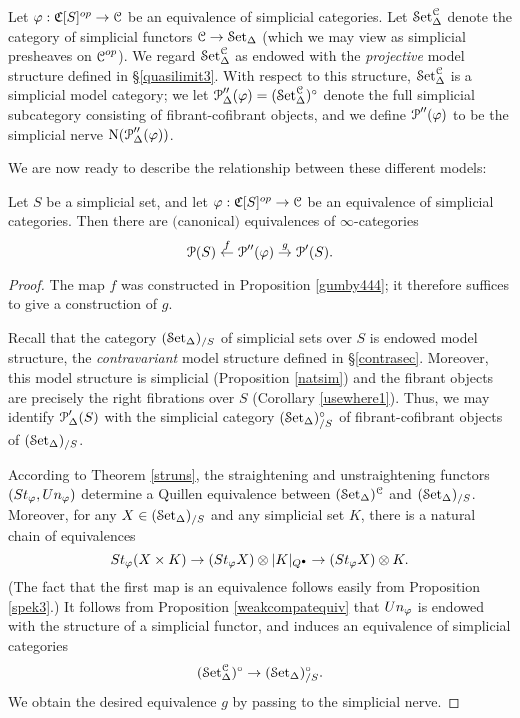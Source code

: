 Let $\varphi: \operatorname{\mathfrak{C}}[S]^{op} \rightarrow \operatorname{\mathcal{C}}$ be an equivalence of simplicial categories.
Let $\operatorname{\mathcal{S}et}_{\Delta}^{\operatorname{\mathcal{C}}}$ denote the category of simplicial functors $\operatorname{\mathcal{C}} \rightarrow \operatorname{\mathcal{S}et_{\Delta}}$ (which we may view as simplicial presheaves on $\operatorname{\mathcal{C}}^{op}$). We regard $\operatorname{\mathcal{S}et}_{\Delta}^{\operatorname{\mathcal{C}}}$ as endowed with the {\em projective} model structure defined in \S \ref{quasilimit3}. With respect to this structure,
$\operatorname{\mathcal{S}et}_{\Delta}^{\operatorname{\mathcal{C}}}$ is a simplicial model category; we let $\operatorname{\mathcal{P}}''_{\Delta}(\varphi) =  (\operatorname{\mathcal{S}et}_{\Delta}^{\operatorname{\mathcal{C}}})^{\circ}$ denote the full simplicial subcategory consisting of fibrant-cofibrant objects, and we define $\operatorname{\mathcal{P}}''(\varphi)$ to be the simplicial nerve $\operatorname{N}(\operatorname{\mathcal{P}}''_{\Delta}(\varphi))$.

We are now ready to describe the relationship between these different models:

\begin{proposition}\label{othermod}
Let $S$ be a simplicial set, and let $\varphi: \operatorname{\mathfrak{C}}[S]^{op} \rightarrow \operatorname{\mathcal{C}}$ be
an equivalence of simplicial categories. Then there are $($canonical$)$ equivalences
of $\infty$-categories
$$ \operatorname{\mathcal{P}}(S) \stackrel{f}{\leftarrow} \operatorname{\mathcal{P}}''(\varphi) \stackrel{g}{\rightarrow} \operatorname{\mathcal{P}}'(S).$$
\end{proposition}

\begin{proof}
The map $f$ was constructed in Proposition \ref{gumby444}; it therefore suffices to give a construction of $g$. 

Recall that the category $(\operatorname{\mathcal{S}et_{\Delta}})_{/S}$ of simplicial sets over $S$ is endowed model structure, the {\it contravariant} model structure defined in \S \ref{contrasec}. Moreover, this model structure is simplicial (Proposition \ref{natsim}) and the fibrant objects are precisely the right fibrations over $S$ (Corollary \ref{usewhere1}). Thus, we may identify
$\operatorname{\mathcal{P}}'_{\Delta}(S)$ with the simplicial category $(\operatorname{\mathcal{S}et_{\Delta}})_{/S}^{\circ}$ of fibrant-cofibrant objects of $(\operatorname{\mathcal{S}et_{\Delta}})_{/S}$. 

According to Theorem \ref{struns}, the straightening and unstraightening functors
$(St_{\varphi}, Un_{\varphi})$ determine a Quillen equivalence between
$(\operatorname{\mathcal{S}et_{\Delta}})^{\operatorname{\mathcal{C}}}$ and $(\operatorname{\mathcal{S}et_{\Delta}})_{/S}$. Moreover, for any $X \in (\operatorname{\mathcal{S}et_{\Delta}})_{/S}$ and any simplicial set $K$, there is a natural chain of equivalences
$$ St_{\varphi} (X \times K) \rightarrow (St_{\varphi} X) \otimes |K|_{Q^{\bullet}} \rightarrow
(St_{\varphi} X) \otimes K.$$
(The fact that the first map is an equivalence follows easily from Proposition \ref{spek3}.)
It follows from Proposition \ref{weakcompatequiv} that $Un_{\varphi}$ is endowed with the structure of a simplicial functor, and induces an equivalence of simplicial categories
$$ (\operatorname{\mathcal{S}et}_{\Delta}^{\operatorname{\mathcal{C}}})^{\circ} \rightarrow  (\operatorname{\mathcal{S}et_{\Delta}})_{/S}^{\circ}.$$
We obtain the desired equivalence $g$ by passing to the simplicial nerve.
\end{proof}

